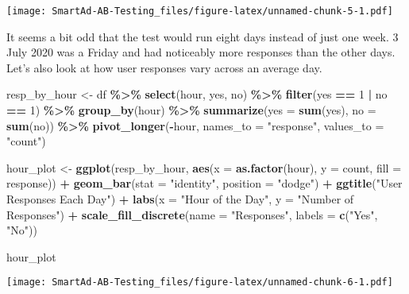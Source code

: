 \documentclass[
]{article}
\newenvironment{Shaded}{\begin{snugshade}}{\end{snugshade}}
\newcommand{\AttributeTok}[1]{\textcolor[rgb]{0.13,0.29,0.53}{#1}}
\newcommand{\DecValTok}[1]{\textcolor[rgb]{0.00,0.00,0.81}{#1}}
\newcommand{\FunctionTok}[1]{\textcolor[rgb]{0.13,0.29,0.53}{\textbf{#1}}}
\newcommand{\NormalTok}[1]{#1}
\newcommand{\OtherTok}[1]{\textcolor[rgb]{0.56,0.35,0.01}{#1}}
\newcommand{\SpecialCharTok}[1]{\textcolor[rgb]{0.81,0.36,0.00}{\textbf{#1}}}
\newcommand{\StringTok}[1]{\textcolor[rgb]{0.31,0.60,0.02}{#1}}
\begin{document}
\texttt{[image: SmartAd-AB-Testing\_files/figure-latex/unnamed-chunk-5-1.pdf]}

It seems a bit odd that the test would run eight days instead of just
one week. 3 July 2020 was a Friday and had noticeably more responses
than the other days. Let's also look at how user responses vary across
an average day.

\begin{Shaded}
\begin{Highlighting}[]
\NormalTok{resp\_by\_hour }\OtherTok{\textless{}{-}}\NormalTok{ df }\SpecialCharTok{\%\textgreater{}\%}
  \FunctionTok{select}\NormalTok{(hour, yes, no) }\SpecialCharTok{\%\textgreater{}\%}
  \FunctionTok{filter}\NormalTok{(yes }\SpecialCharTok{==} \DecValTok{1} \SpecialCharTok{|}\NormalTok{ no }\SpecialCharTok{==} \DecValTok{1}\NormalTok{) }\SpecialCharTok{\%\textgreater{}\%}
  \FunctionTok{group\_by}\NormalTok{(hour) }\SpecialCharTok{\%\textgreater{}\%}
  \FunctionTok{summarize}\NormalTok{(}\AttributeTok{yes =} \FunctionTok{sum}\NormalTok{(yes), }\AttributeTok{no =} \FunctionTok{sum}\NormalTok{(no)) }\SpecialCharTok{\%\textgreater{}\%}
  \FunctionTok{pivot\_longer}\NormalTok{(}\SpecialCharTok{{-}}\NormalTok{hour, }\AttributeTok{names\_to =} \StringTok{"response"}\NormalTok{, }\AttributeTok{values\_to =} \StringTok{"count"}\NormalTok{)}

\NormalTok{hour\_plot }\OtherTok{\textless{}{-}} \FunctionTok{ggplot}\NormalTok{(resp\_by\_hour, }\FunctionTok{aes}\NormalTok{(}\AttributeTok{x =} \FunctionTok{as.factor}\NormalTok{(hour), }\AttributeTok{y =}\NormalTok{ count, }\AttributeTok{fill =}\NormalTok{ response)) }\SpecialCharTok{+}
  \FunctionTok{geom\_bar}\NormalTok{(}\AttributeTok{stat =} \StringTok{"identity"}\NormalTok{, }\AttributeTok{position =} \StringTok{"dodge"}\NormalTok{) }\SpecialCharTok{+}
  \FunctionTok{ggtitle}\NormalTok{(}\StringTok{"User Responses Each Day"}\NormalTok{) }\SpecialCharTok{+}
  \FunctionTok{labs}\NormalTok{(}\AttributeTok{x =} \StringTok{"Hour of the Day"}\NormalTok{, }\AttributeTok{y =} \StringTok{"Number of Responses"}\NormalTok{) }\SpecialCharTok{+} 
  \FunctionTok{scale\_fill\_discrete}\NormalTok{(}\AttributeTok{name =} \StringTok{"Responses"}\NormalTok{, }\AttributeTok{labels =} \FunctionTok{c}\NormalTok{(}\StringTok{"Yes"}\NormalTok{, }\StringTok{"No"}\NormalTok{))}

\NormalTok{hour\_plot}
\end{Highlighting}
\end{Shaded}

\texttt{[image: SmartAd-AB-Testing\_files/figure-latex/unnamed-chunk-6-1.pdf]}
\end{document}
